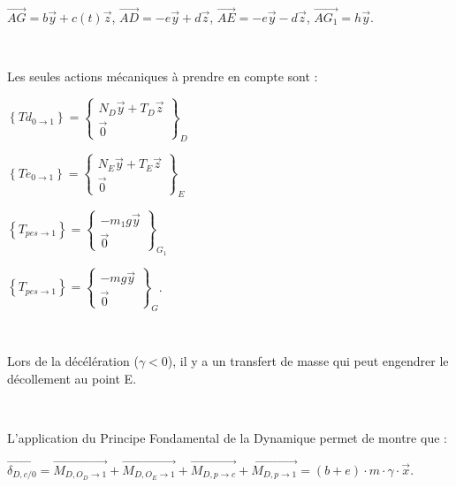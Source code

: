 ~\

$\overrightarrow{AG}=b\vec{y}+c(t)\vec{z}$, $\overrightarrow{AD}=-e\vec{y}+d\vec{z}$, $\overrightarrow{AE}=-e\vec{y}-d\vec{z}$, $\overrightarrow{AG_1}=h\vec{y}$.

~\

Les seules actions mécaniques à prendre en compte sont :

\begin{minipage}{0.49\linewidth}
$\left\{Td_{0\rightarrow 1}\right\}=\left\{\begin{array}{c}
N_D\vec{y}+T_D\vec{z}\\\vec{0}\end{array}\right\}_D$

$\left\{Te_{0\rightarrow 1}\right\}=\left\{\begin{array}{c}
N_E\vec{y}+T_E\vec{z}\\\vec{0}\end{array}\right\}_E$
\end{minipage}\hfill
\begin{minipage}{0.49\linewidth}
$\left\{T_{pes\rightarrow 1}\right\}=\left\{\begin{array}{c}
-m_1g\vec{y}\\\vec{0}\end{array}\right\}_{G_1}$

$\left\{T_{pes\rightarrow 1}\right\}=\left\{\begin{array}{c}
-mg\vec{y}\\\vec{0}\end{array}\right\}_G$.
\end{minipage}

~\

Lors de la décélération ($\gamma<0$), il y a un transfert de masse qui peut engendrer le décollement au point E.


~\

L'application du Principe Fondamental de la Dynamique permet de montre que :

$\overrightarrow{\delta_{D,c/0}}=\overrightarrow{M_{D,O_D\rightarrow 1}}+\overrightarrow{M_{D,O_E\rightarrow 1}}+\overrightarrow{M_{D,p\rightarrow c}}+\overrightarrow{M_{D,p\rightarrow 1}}=(b+e)\cdot m\cdot\gamma\cdot \vec{x}$.


